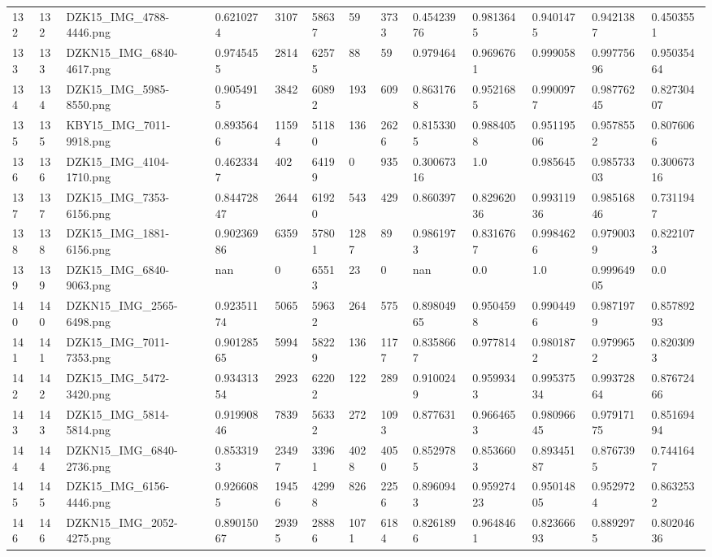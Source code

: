 \documentclass[11pt, a4paper, twoside]{report}
\begin{document}
\begin{longtable}[c]{@{}lllllllllllll@{}}
132 & 132 & DZK15\_IMG\_4788-4446.png & 0.6210274 & 3107 & 58637 & 59 & 3733 & 0.45423976 & 0.9813645 & 0.9401475 & 0.9421387 & 0.4503551 \\
133 & 133 & DZKN15\_IMG\_6840-4617.png & 0.9745455 & 2814 & 62575 & 88 & 59 & 0.979464 & 0.9696761 & 0.999058 & 0.99775696 & 0.95035464 \\
134 & 134 & DZK15\_IMG\_5985-8550.png & 0.9054915 & 3842 & 60892 & 193 & 609 & 0.8631768 & 0.9521685 & 0.9900977 & 0.98776245 & 0.82730407 \\
135 & 135 & KBY15\_IMG\_7011-9918.png & 0.8935646 & 11594 & 51180 & 136 & 2626 & 0.8153305 & 0.9884058 & 0.95119506 & 0.9578552 & 0.8076066 \\
136 & 136 & DZK15\_IMG\_4104-1710.png & 0.4623347 & 402 & 64199 & 0 & 935 & 0.30067316 & 1.0 & 0.985645 & 0.98573303 & 0.30067316 \\
137 & 137 & DZK15\_IMG\_7353-6156.png & 0.84472847 & 2644 & 61920 & 543 & 429 & 0.860397 & 0.82962036 & 0.99311936 & 0.98516846 & 0.7311947 \\
138 & 138 & DZK15\_IMG\_1881-6156.png & 0.90236986 & 6359 & 57801 & 1287 & 89 & 0.9861973 & 0.8316767 & 0.9984626 & 0.9790039 & 0.8221073 \\
139 & 139 & DZK15\_IMG\_6840-9063.png & nan & 0 & 65513 & 23 & 0 & nan & 0.0 & 1.0 & 0.99964905 & 0.0 \\
140 & 140 & DZKN15\_IMG\_2565-6498.png & 0.92351174 & 5065 & 59632 & 264 & 575 & 0.89804965 & 0.9504598 & 0.9904496 & 0.9871979 & 0.85789293 \\
141 & 141 & DZK15\_IMG\_7011-7353.png & 0.90128565 & 5994 & 58229 & 136 & 1177 & 0.8358667 & 0.977814 & 0.9801872 & 0.9799652 & 0.8203093 \\
142 & 142 & DZK15\_IMG\_5472-3420.png & 0.93431354 & 2923 & 62202 & 122 & 289 & 0.9100249 & 0.9599343 & 0.99537534 & 0.99372864 & 0.87672466 \\
143 & 143 & DZK15\_IMG\_5814-5814.png & 0.91990846 & 7839 & 56332 & 272 & 1093 & 0.877631 & 0.9664653 & 0.98096645 & 0.97917175 & 0.85169494 \\
144 & 144 & DZKN15\_IMG\_6840-2736.png & 0.8533193 & 23497 & 33961 & 4028 & 4050 & 0.8529785 & 0.8536603 & 0.89345187 & 0.8767395 & 0.7441647 \\
145 & 145 & DZK15\_IMG\_6156-4446.png & 0.9266085 & 19456 & 42998 & 826 & 2256 & 0.8960943 & 0.95927423 & 0.95014805 & 0.9529724 & 0.8632532 \\
146 & 146 & DZKN15\_IMG\_2052-4275.png & 0.89015067 & 29395 & 28886 & 1071 & 6184 & 0.8261896 & 0.9648461 & 0.82366693 & 0.8892975 & 0.80204636 \\

\end{longtable}
\end{document}
